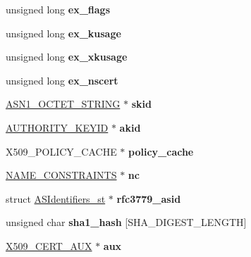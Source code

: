 \begin{DoxyCompactItemize}
\item 
\hypertarget{structx509__st_afc5106add019789df9b25ab6a1ff07ce}{}unsigned long {\bfseries ex\+\_\+flags}\label{structx509__st_afc5106add019789df9b25ab6a1ff07ce}

\item 
\hypertarget{structx509__st_aa22af4cd664504cf5d8f910bc2dc4caf}{}unsigned long {\bfseries ex\+\_\+kusage}\label{structx509__st_aa22af4cd664504cf5d8f910bc2dc4caf}

\item 
\hypertarget{structx509__st_a476d2351651a42fae4b5a8cf9d67ae8e}{}unsigned long {\bfseries ex\+\_\+xkusage}\label{structx509__st_a476d2351651a42fae4b5a8cf9d67ae8e}

\item 
\hypertarget{structx509__st_ae26ccfc73c4ca44fc360d90c894f321c}{}unsigned long {\bfseries ex\+\_\+nscert}\label{structx509__st_ae26ccfc73c4ca44fc360d90c894f321c}

\item 
\hypertarget{structx509__st_a6ebe771c246586c77c91f2deca26b84d}{}\hyperlink{structasn1__string__st}{A\+S\+N1\+\_\+\+O\+C\+T\+E\+T\+\_\+\+S\+T\+R\+I\+N\+G} $\ast$ {\bfseries skid}\label{structx509__st_a6ebe771c246586c77c91f2deca26b84d}

\item 
\hypertarget{structx509__st_a0e11914f6c1933ca2734bea95f06cf78}{}\hyperlink{struct_a_u_t_h_o_r_i_t_y___k_e_y_i_d__st}{A\+U\+T\+H\+O\+R\+I\+T\+Y\+\_\+\+K\+E\+Y\+I\+D} $\ast$ {\bfseries akid}\label{structx509__st_a0e11914f6c1933ca2734bea95f06cf78}

\item 
\hypertarget{structx509__st_af85ce8a268304c4850f30343b17c018c}{}X509\+\_\+\+P\+O\+L\+I\+C\+Y\+\_\+\+C\+A\+C\+H\+E $\ast$ {\bfseries policy\+\_\+cache}\label{structx509__st_af85ce8a268304c4850f30343b17c018c}

\item 
\hypertarget{structx509__st_a1f79b4f8402d962b6cee671e70c9b661}{}\hyperlink{struct_n_a_m_e___c_o_n_s_t_r_a_i_n_t_s__st}{N\+A\+M\+E\+\_\+\+C\+O\+N\+S\+T\+R\+A\+I\+N\+T\+S} $\ast$ {\bfseries nc}\label{structx509__st_a1f79b4f8402d962b6cee671e70c9b661}

\item 
\hypertarget{structx509__st_a0a127b4d4820f45ad31d8b565c9d6341}{}struct \hyperlink{struct_a_s_identifiers__st}{A\+S\+Identifiers\+\_\+st} $\ast$ {\bfseries rfc3779\+\_\+asid}\label{structx509__st_a0a127b4d4820f45ad31d8b565c9d6341}

\item 
\hypertarget{structx509__st_a5f14592600ea066dea895667d98f8614}{}unsigned char {\bfseries sha1\+\_\+hash} \mbox{[}S\+H\+A\+\_\+\+D\+I\+G\+E\+S\+T\+\_\+\+L\+E\+N\+G\+T\+H\mbox{]}\label{structx509__st_a5f14592600ea066dea895667d98f8614}

\item 
\hypertarget{structx509__st_aa65a773dc5963a057790ccc63ca0a169}{}\hyperlink{structx509__cert__aux__st}{X509\+\_\+\+C\+E\+R\+T\+\_\+\+A\+U\+X} $\ast$ {\bfseries aux}\label{structx509__st_aa65a773dc5963a057790ccc63ca0a169}

\end{DoxyCompactItemize}


